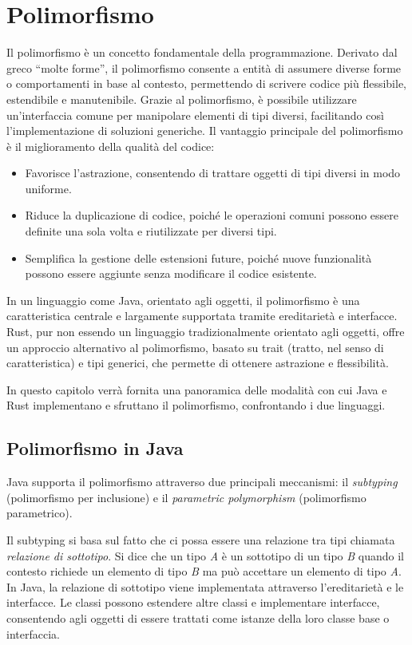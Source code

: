 
\chapter{Polimorfismo}
Il polimorfismo è un concetto fondamentale della programmazione. Derivato dal greco “molte forme”, il polimorfismo consente a entità di assumere diverse forme o comportamenti in base al contesto, permettendo di scrivere codice più flessibile, estendibile e manutenibile. Grazie al polimorfismo, è possibile utilizzare un'interfaccia comune per manipolare elementi di tipi diversi, facilitando così l'implementazione di soluzioni generiche. Il vantaggio principale del polimorfismo è il miglioramento della qualità del codice:
\begin{itemize}
    \item Favorisce l'astrazione, consentendo di trattare oggetti di tipi diversi in modo uniforme.
    \item Riduce la duplicazione di codice, poiché le operazioni comuni possono essere definite una sola volta e riutilizzate per diversi tipi.
    \item Semplifica la gestione delle estensioni future, poiché nuove funzionalità possono essere aggiunte senza modificare il codice esistente.
\end{itemize}
In un linguaggio come Java, orientato agli oggetti, il polimorfismo è una caratteristica centrale e largamente supportata tramite ereditarietà e interfacce. Rust, pur non essendo un linguaggio tradizionalmente orientato agli oggetti, offre un approccio alternativo al polimorfismo, basato su trait (tratto, nel senso di caratteristica) e tipi generici, che permette di ottenere astrazione e flessibilità.

In questo capitolo verrà fornita una panoramica delle modalità con cui Java e Rust implementano e sfruttano il polimorfismo, confrontando i due linguaggi.

\section{Polimorfismo in Java}
Java supporta il polimorfismo attraverso due principali meccanismi: il \textit{subtyping} (polimorfismo per inclusione) e il \textit{parametric polymorphism} (polimorfismo parametrico). 

Il subtyping si basa sul fatto che ci possa essere una relazione tra tipi chiamata \textit{relazione di sottotipo}. Si dice che un tipo \textit{A} è un sottotipo di un tipo \textit{B} quando il contesto richiede un elemento di tipo \textit{B} ma può accettare un elemento di tipo \textit{A}. In Java, la relazione di sottotipo viene implementata attraverso l'ereditarietà e le interfacce. Le classi possono estendere altre classi e implementare interfacce, consentendo agli oggetti di essere trattati come istanze della loro classe base o interfaccia. 

